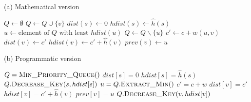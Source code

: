 \begin{algorithm}[H]
    \caption{A* algorithm}
    \label{alg-astar}
    \begin{minipage}[t]{0.49\linewidth}
        (a) Mathematical version
        \begin{algorithmic}[1]
                \State $Q \gets \emptyset$
                    \State $Q \gets Q \cup \{v\}$
                \EndFor
                \State $dist(s) \gets 0$
                \State $hdist(s) \gets \hat{h}(s)$
                    \State $u \gets \text{element of } Q \text{ with least } hdist(u)$
                      \EndIf
                    \State $Q \gets Q \backslash \{u\}$
                        \State $c' \gets c + w(u, v)$
                            \State $dist(v) \gets c'$
                            \State $hdist(v) \gets c'+\hat{h}(v)$
                            \State $prev(v) \gets u$
                        \EndIf
                    \EndFor
                \EndWhile
            \EndFunction
        \end{algorithmic}
    \end{minipage}
    \begin{minipage}[t]{0.49\linewidth}
        (b) Programmatic version
        \begin{algorithmic}[1]
                \State $Q = \Call{Min\_Priority\_Queue}{ }$
                \EndFor
                \State $dist[s] = 0$
                \State $hdist[s] = \hat{h}(s)$
                \State $Q.\Call{Decrease\_Key}{s, hdist[s]}$
                    \State $u = Q.\Call{Extract\_Min}{ }$
                      \EndIf
                        \State $c' = c + w$
                            \State $dist[v] = c'$
                            \State $hdist[v] = c'+\hat{h}(v)$
                            \State $prev[v] = u$
                            \State $Q.\Call{Decrease\_Key}{v, hdist[v]}$
                        \EndIf
                    \EndFor
                \EndWhile
            \EndFunction
        \end{algorithmic}
    \end{minipage}
\end{algorithm}

